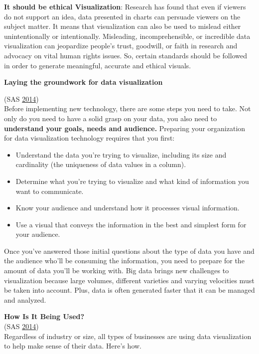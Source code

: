 \documentclass[]{book}
\providecommand{\tightlist}{%
  \setlength{\itemsep}{0pt}\setlength{\parskip}{0pt}}
\begin{document}
\textbf{It should be ethical Visualization}: Research has found that
even if viewers do not support an idea, data presented in charts can
persuade viewers on the subject matter. It means that visualization can
also be used to mislead either unintentionally or intentionally.
Misleading, incomprehensible, or incredible data visualization can
jeopardize people's trust, goodwill, or faith in research and advocacy
on vital human rights issues. So, certain standards should be followed
in order to generate meaningful, accurate and ethical visuals.

\textbf{Laying the groundwork for data visualization}

(SAS \protect\hyperlink{ref-why_dataviz_matters}{2014})\\
Before implementing new technology, there are some steps you need to
take. Not only do you need to have a solid grasp on your data, you also
need to \textbf{understand your goals, needs and audience.} Preparing
your organization for data visualization technology requires that you
first:

\begin{itemize}
\tightlist
\item
  Understand the data you're trying to visualize, including its size and
  cardinality (the uniqueness of data values in a column).
\item
  Determine what you're trying to visualize and what kind of information
  you want to communicate.
\item
  Know your audience and understand how it processes visual information.
\item
  Use a visual that conveys the information in the best and simplest
  form for your audience.
\end{itemize}

Once you've answered those initial questions about the type of data you
have and the audience who'll be consuming the information, you need to
prepare for the amount of data you'll be working with. Big data brings
new challenges to visualization because large volumes, different
varieties and varying velocities must be taken into account. Plus, data
is often generated faster that it can be managed and analyzed.

\textbf{How Is It Being Used?}\\
(SAS \protect\hyperlink{ref-why_dataviz_matters}{2014})\\
Regardless of industry or size, all types of businesses are using data
visualization to help make sense of their data. Here's how.
\end{document}
